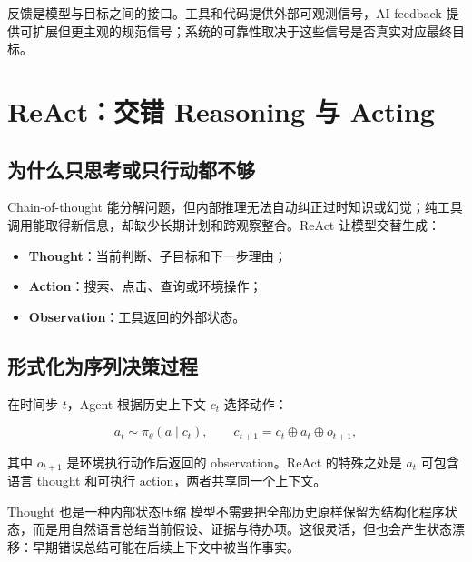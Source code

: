 \documentclass[a4paper]{article}
\begin{document}
反馈是模型与目标之间的接口。工具和代码提供外部可观测信号，AI feedback 提供可扩展但更主观的规范信号；系统的可靠性取决于这些信号是否真实对应最终目标。

\section{ReAct：交错 Reasoning 与 Acting}

\subsection{为什么只思考或只行动都不够}

Chain-of-thought 能分解问题，但内部推理无法自动纠正过时知识或幻觉；纯工具调用能取得新信息，却缺少长期计划和跨观察整合。ReAct 让模型交替生成：

\begin{itemize}
    \item \textbf{Thought}：当前判断、子目标和下一步理由；
    \item \textbf{Action}：搜索、点击、查询或环境操作；
    \item \textbf{Observation}：工具返回的外部状态。
\end{itemize}



\subsection{形式化为序列决策过程}

在时间步 $t$，Agent 根据历史上下文 $c_t$ 选择动作：

$$
a_t\sim\pi_\theta(a\mid c_t),\qquad
c_{t+1}=c_t\oplus a_t\oplus o_{t+1},
$$

其中 $o_{t+1}$ 是环境执行动作后返回的 observation。ReAct 的特殊之处是 $a_t$ 可包含语言 thought 和可执行 action，两者共享同一个上下文。


\begin{knowledgebox}{Thought 也是一种内部状态压缩}
模型不需要把全部历史原样保留为结构化程序状态，而是用自然语言总结当前假设、证据与待办项。这很灵活，但也会产生状态漂移：早期错误总结可能在后续上下文中被当作事实。
\end{knowledgebox}
\end{document}
